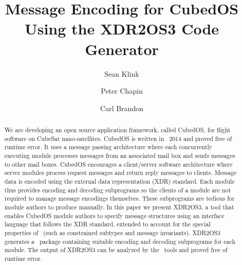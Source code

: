 \documentclass{llncs}
\begin{document}
\title{Message Encoding for CubedOS Using the XDR2OS3 Code Generator}
\author{Sean Klink \and Peter Chapin \and Carl Brandon }


\maketitle

\begin{abstract}

  We are developing an open source application framework, called CubedOS, for flight software on
  CubeSat nano-satellites. CubedOS is written in \SPARK\ 2014 and proved free of runtime error.
  It uses a message passing architecture where each concurrently executing module processes
  messages from an associated mail box and sends messages to other mail boxes. CubedOS
  encourages a client/server software architecture where server modules process request messages
  and return reply messages to clients. Message data is encoded using the external data
  representation (XDR) standard. Each module thus provides encoding and decoding subprograms so
  the clients of a module are not required to manage message encodings themselves. These
  subprograms are tedious for module authors to produce manually. In this paper we present
  XDR2OS3, a tool that enables CubedOS module authors to specify message structures using an
  interface language that follows the XDR standard, extended to account for the special
  properties of \SPARK\ (such as constrained subtypes and message invariants). XDR2OS3 generates
  a \SPARK\ package containing suitable encoding and decoding subprograms for each module. The
  output of XDR2OS3 can be analyzed by the \SPARK\ tools and proved free of runtime error.

\end{abstract}









\end{document}
